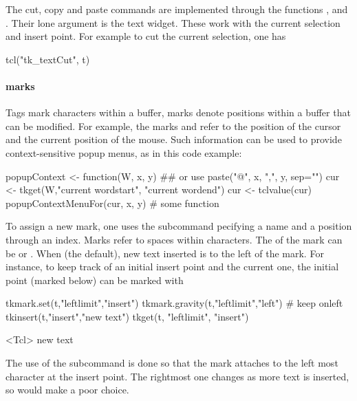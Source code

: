 The cut, copy and paste commands are implemented through the functions
,  and
. Their lone argument is the text widget. These
work with the current selection and insert point. For example to cut
the current selection, one has
\begin{Schunk}
\begin{Sinput}
 tcl("tk_textCut", t)
\end{Sinput}
\end{Schunk}

\paragraph{marks}
Tags mark characters within a buffer, marks denote positions within a
buffer that can be modified. For example, the marks  and
 refer to the position of the cursor and the current
position of the mouse. Such information can be used to provide
context-sensitive popup menus, as in this code example:
\begin{Schunk}
\begin{Sinput}
 popupContext <- function(W, x, y) {
   ## or use paste("@", x, ",", y, sep="")
   cur <- tkget(W,"current  wordstart", "current wordend") 
   cur <- tclvalue(cur)
   popupContextMenuFor(cur, x, y)        # some function
 }
\end{Sinput}
\end{Schunk}

To assign a new mark, one uses the  subcommand pecifying a name and a position through an index. Marks refer to spaces within characters. The  of the mark can be  or . When  (the default), new text inserted is to the left of the mark. For instance, to keep track of an initial insert point and the current one, the initial point (marked  below) can be marked with
\begin{Schunk}
\begin{Sinput}
 tkmark.set(t,"leftlimit","insert")
 tkmark.gravity(t,"leftlimit","left")    # keep onleft
 tkinsert(t,"insert","new text")
 tkget(t, "leftlimit", "insert")
\end{Sinput}
\begin{Soutput}
<Tcl> new text 
\end{Soutput}
\end{Schunk}
The use of the subcommand  is done so that the mark attaches to the left most character at the insert point. The rightmost one changes as more text is inserted, so would make a poor choice. 


